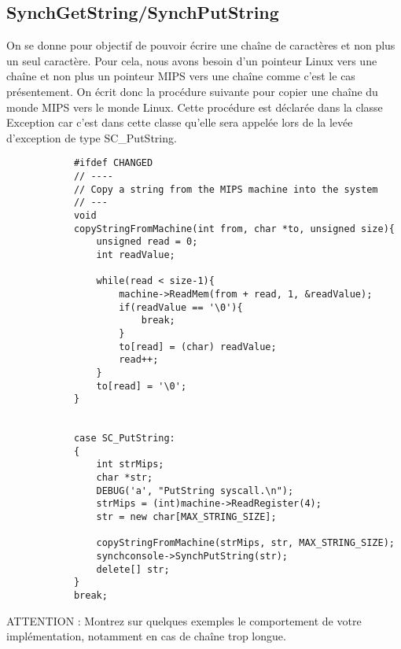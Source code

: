 \documentclass[a4paper,10pt]{article}
\begin{document}
    \subsection{SynchGetString/SynchPutString}
        On se donne pour objectif de pouvoir écrire une chaîne de caractères et non plus un seul caractère. Pour cela, nous avons besoin d'un pointeur Linux vers une chaîne et non plus un pointeur MIPS vers une chaîne comme c'est le cas présentement. On écrit donc la procédure suivante pour copier une chaîne du monde MIPS vers le monde Linux. Cette procédure est déclarée dans la classe Exception car c'est dans cette classe qu'elle sera appelée lors de la levée d'exception de type SC\_PutString.
        \begin{lstlisting}
            #ifdef CHANGED
            // ----
            // Copy a string from the MIPS machine into the system
            // ---
            void
            copyStringFromMachine(int from, char *to, unsigned size){
                unsigned read = 0;
                int readValue;

                while(read < size-1){
                    machine->ReadMem(from + read, 1, &readValue);
                    if(readValue == '\0'){
                        break;
                    }
                    to[read] = (char) readValue;
                    read++;
                }
                to[read] = '\0';
            }


            case SC_PutString:
            {
                int strMips;
                char *str;
                DEBUG('a', "PutString syscall.\n");
                strMips = (int)machine->ReadRegister(4);
                str = new char[MAX_STRING_SIZE];

                copyStringFromMachine(strMips, str, MAX_STRING_SIZE);
                synchconsole->SynchPutString(str);
                delete[] str;
            }
            break;
         \end{lstlisting}

         ATTENTION : Montrez sur quelques exemples le comportement de votre implémentation, notamment en cas de chaîne trop longue.
\end{document}
